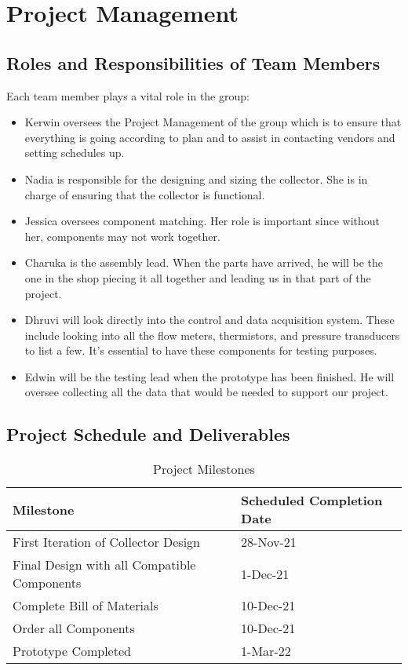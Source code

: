 \chapter{Project Management}

\section{Roles and Responsibilities of Team Members}

Each team member plays a vital role in the group:

\medskip
\begin{itemize}[itemsep=3mm, parsep=-1mm]
    \item Kerwin oversees the Project Management of the group which is to ensure that everything is going according to plan and to assist in contacting vendors and setting schedules up. 
    \item Nadia is responsible for the designing and sizing the collector. She is in charge of ensuring that the collector is functional.
    \item Jessica oversees component matching. Her role is important since without her, components may not work together.
    \item Charuka is the assembly lead. When the parts have arrived, he will be the one in the shop piecing it all together and leading us in that part of the project.
    \item Dhruvi will look directly into the control and data acquisition system. These include looking into all the flow meters, thermistors, and pressure transducers to list a few. It’s essential to have these components for testing purposes.
    \item Edwin will be the testing lead when the prototype has been finished. He will oversee collecting all the data that would be needed to support our project.
\end{itemize}

\section{Project Schedule and Deliverables}

\begin{table}[H]
\centering
\caption{Project Milestones}
\begin{tabular}{|P{75mm}|P{75mm}|}
    \hline
    Milestone & Scheduled Completion Date \\
    \hline
    First Iteration of Collector Design         & 28-Nov-21 \\
    Final Design with all Compatible Components & 1-Dec-21  \\
    Complete Bill of Materials                  & 10-Dec-21 \\
    Order all Components                        & 10-Dec-21 \\
    Prototype Completed                         & 1-Mar-22  \\
    \hline
\end{tabular}
\end{table}

